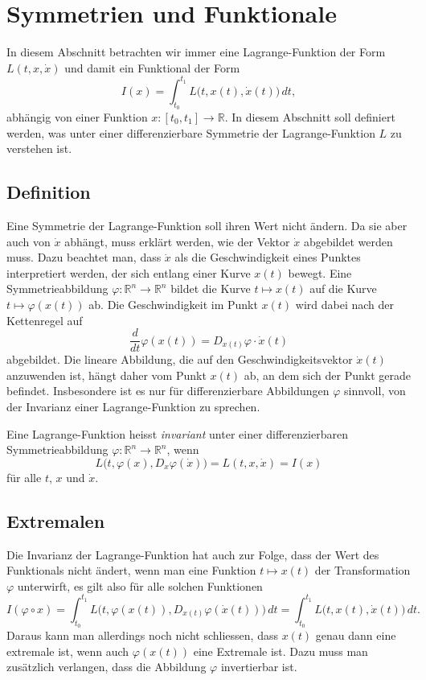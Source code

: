 %
%
%
\section{Symmetrien und Funktionale
\label{buch:symmetrien:section:symmetrie}}
In diesem Abschnitt betrachten wir immer eine Lagrange-Funktion
der Form $L(t,x,\dot{x})$ und damit ein Funktional der Form
\[
I(x)
=
\int_{t_0}^{t_1}
L\bigl(t,x(t),\dot{x}(t)\bigr)\,dt,
\]
abhängig von einer Funktion $x\colon[t_0,t_1]\to\mathbb{R}$.
In diesem Abschnitt soll definiert werden, was unter einer
differenzierbare Symmetrie der Lagrange-Funktion $L$ zu verstehen
ist.

%
%
\subsection{Definition}
Eine Symmetrie der Lagrange-Funktion soll ihren Wert nicht ändern.
Da sie aber auch von $\dot{x}$ abhängt, muss erklärt werden, wie
der Vektor $\dot{x}$ abgebildet werden muss.
Dazu beachtet man, dass $\dot{x}$ als die Geschwindigkeit eines
Punktes interpretiert werden, der sich entlang einer Kurve $x(t)$
bewegt.
Eine Symmetrieabbildung $\varphi\colon\mathbb{R}^n\to\mathbb{R}^n$ 
bildet die Kurve $t\mapsto x(t)$ auf die Kurve $t\mapsto \varphi(x(t))$
ab. 
Die Geschwindigkeit im Punkt $x(t)$ wird dabei nach der Kettenregel
auf 
\[
\frac{d}{dt}\varphi(x(t))
=
D_{x(t)}\varphi\cdot \dot{x}(t)
\]
abgebildet.
Die lineare Abbildung, die auf den Geschwindigkeitsvektor $\dot{x}(t)$
anzuwenden ist, hängt daher vom Punkt $x(t)$ ab, an dem sich der
Punkt gerade befindet.
Insbesondere ist es nur für differenzierbare Abbildungen $\varphi$
sinnvoll, von der Invarianz einer Lagrange-Funktion zu sprechen.

\begin{definition}
Eine Lagrange-Funktion heisst {\em invariant} unter einer differenzierbaren
%
Symmetrieabbildung $\varphi\colon\mathbb{R}^n\to\mathbb{R}^n$, wenn
\[
L\bigl(t,\varphi(x), D_x\varphi(\dot{x})\bigr)
=
L(t,x,\dot{x})
=
I(x)
\]
für alle $t$, $x$ und $\dot{x}$.
\end{definition}

%
%
\subsection{Extremalen}
Die Invarianz der Lagrange-Funktion hat auch zur Folge, dass der
Wert des Funktionals nicht ändert, wenn man eine Funktion $t\mapsto x(t)$
der Transformation $\varphi$ unterwirft, es gilt also für alle
solchen Funktionen
\[
I(\varphi\circ x)
=
\int_{t_0}^{t_1}
L\bigl(t,\varphi(x(t)),D_{x(t)}\varphi(\dot{x}(t))\bigr)
\,dt
=
\int_{t_0}^{t_1}
L\bigl(t,x(t),\dot{x}(t)\bigr)
\,dt.
\]
Daraus kann man allerdings noch nicht schliessen, dass $x(t)$ genau
dann eine extremale ist, wenn auch $\varphi(x(t))$ eine Extremale ist.
Dazu muss man zusätzlich verlangen, dass die Abbildung $\varphi$
invertierbar ist.

